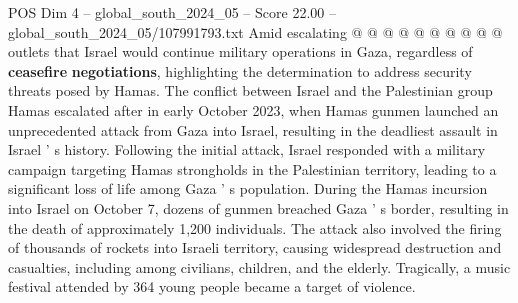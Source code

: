 \begin{textsample}{POS Dim 4 – global\_south\_2024\_05 – Score 22.00 – global\_south\_2024\_05/107991793.txt}
Amid escalating @ @ @ @ @ @ @ @ @ @ outlets that Israel would continue military operations in Gaza, regardless of \textbf{ceasefire} \textbf{negotiations}, highlighting the determination to address security threats posed by Hamas.
The conflict between Israel and the Palestinian group Hamas escalated after in early October 2023, when Hamas gunmen launched an unprecedented attack from Gaza into Israel, resulting in the deadliest assault in Israel ' s history.
Following the initial attack, Israel responded with a military campaign targeting Hamas strongholds in the Palestinian territory, leading to a significant loss of life among Gaza ' s population.
During the Hamas incursion into Israel on October 7, dozens of gunmen breached Gaza ' s border, resulting in the death of approximately 1,200 individuals.
The attack also involved the firing of thousands of rockets into Israeli territory, causing widespread destruction and casualties, including among civilians, children, and the elderly.
Tragically, a music festival attended by 364 young people became a target of violence.

\end{textsample}
